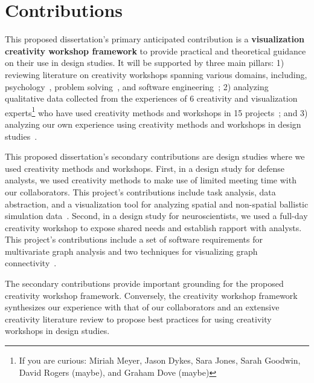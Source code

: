 \section{Contributions}

This proposed dissertation's primary anticipated contribution is a {\bf visualization creativity workshop framework} to provide practical and theoretical guidance on their use in design studies. It will be supported by three main pillars: 1) reviewing literature on creativity workshops spanning various domains, including, psychology~\cite{Csikszentmihalyi1997,Gardiner1993,Kaufman2006,Sawyer2006,Sawyer2003}, problem solving~\cite{Michalko2006,Gordon1961,Couger1993,DeBono1983,Osborn1953,Miller1989}, and software engineering~\cite{Sanders2008,Dove2015,Sherwin2011,Muller1993,Sanders2010,Mahaux2014,Mahaux2014,Mahaux2007,Jones2008,Jones2007,Maiden2007,Maiden2005,Maiden2004}; 2) analyzing qualitative data collected from the experiences of 6 creativity and visualization experts\footnote{If you are curious: Miriah Meyer, Jason Dykes, Sara Jones, Sarah Goodwin, David Rogers (maybe), and Graham Dove (maybe)} who have used creativity methods and workshops in 15 projects~\cite{Dykes2010,Goodwin2013,Goodwin2016,Koh2011,Walker2013,Rogers2016,Jones2008,Jones2007,Nobre2017,Horkoff2015,Lisle2017,Dove2015}; and 3) analyzing our own experience using creativity methods and workshops in design studies~\cite{Kerzner2015,Kerzner2017}.

This proposed dissertation's secondary contributions are design studies where we used creativity methods and workshops. First, in a design study for defense analysts, we used creativity methods to make use of limited meeting time with our collaborators. This project's contributions include task analysis, data abstraction, and a visualization tool for analyzing spatial and non-spatial ballistic simulation data~\cite{Kerzner2015,Gribble2014}. Second, in a design study for neuroscientists, we used a full-day creativity workshop to expose shared needs and establish rapport with analysts. This project's contributions include a set of software requirements for multivariate graph analysis and two techniques for visualizing graph connectivity~\cite{Kerzner2017,Lauritzen2016}.

The secondary contributions provide important grounding for the proposed creativity workshop framework. Conversely, the creativity workshop framework synthesizes our experience with that of our collaborators and an extensive creativity literature review to propose best practices for using creativity workshops in design studies.

